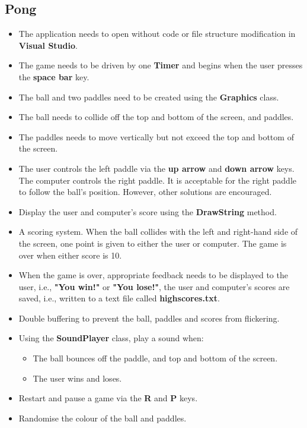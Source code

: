 \documentclass{article}
\begin{document}
\subsection*{Pong}
\begin{itemize}
    \item The application needs to open without code or file structure modification in \textbf{Visual Studio}.
    \item The game needs to be driven by one \textbf{Timer} and begins when the user presses the \textbf{space bar} key.
    \item The ball and two paddles need to be created using the \textbf{Graphics} class. 
    \item The ball needs to collide off the top and bottom of the screen, and paddles.
    \item The paddles needs to move vertically but not exceed the top and bottom of the screen.
    \item The user controls the left paddle via the \textbf{up arrow} and \textbf{down arrow} keys. The computer controls the right paddle. It is acceptable for the right paddle to follow the ball's position. However, other solutions are encouraged.
    \item Display the user and computer's score using the \textbf{DrawString} method.
    \item A scoring system. When the ball collides with the left and right-hand side of the screen, one point is given to either the user or computer. The game is over when either score is 10. 
    \item When the game is over, appropriate feedback needs to be displayed to the user, i.e., \textbf{"You win!"} or \textbf{"You lose!"}, the user and computer's scores are saved, i.e., written to a text file called \textbf{highscores.txt}. 
    \item Double buffering to prevent the ball, paddles and scores from flickering.
    \item Using the \textbf{SoundPlayer} class, play a sound when:
    \begin{itemize}
        \item The ball bounces off the paddle, and top and bottom of the screen.
        \item The user wins and loses.
    \end{itemize}
    \item Restart and pause a game via the \textbf{R} and \textbf{P} keys.
    \item Randomise the colour of the ball and paddles.
\end{itemize}
\end{document}
